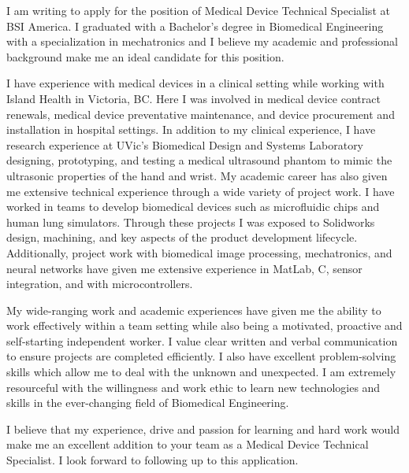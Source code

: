\documentclass[11pt,a4paper,sans]{moderncv}        %
\begin{document}
I am writing to apply for the position of Medical Device Technical Specialist at BSI America. I graduated with a Bachelor's degree in Biomedical Engineering with a specialization in mechatronics and I believe my academic and professional background make me an ideal candidate for this position.

I have experience with medical devices in a clinical setting while working with Island Health in Victoria, BC. Here I was involved in medical device contract renewals, medical device preventative maintenance, and device procurement and installation in hospital settings. In addition to my clinical experience, I have research experience at UVic's Biomedical Design and Systems Laboratory designing, prototyping, and testing a medical ultrasound phantom to mimic the ultrasonic properties of the hand and wrist. My academic career has also given me extensive technical experience through a wide variety of project work. I have worked in teams to develop biomedical devices such as microfluidic chips and human lung simulators. Through these projects I was exposed to Solidworks design, machining, and key aspects of the product development lifecycle. Additionally, project work with biomedical image processing, mechatronics, and neural networks have given me extensive experience in MatLab, C, sensor integration, and with microcontrollers.

My wide-ranging work and academic experiences have given me the ability to work effectively within a team setting while also being a motivated, proactive and self-starting independent worker. I value clear written and verbal communication to ensure projects are completed efficiently. I also have excellent problem-solving skills which allow me to deal with the unknown and unexpected. I am extremely resourceful with the willingness and work ethic to learn new technologies and skills in the ever-changing field of Biomedical Engineering. 

I believe that my experience, drive and passion for learning and hard work would make me an excellent addition to your team as a Medical Device Technical Specialist. I look forward to following up to this application. 

\makeletterclosing



\end{document}
